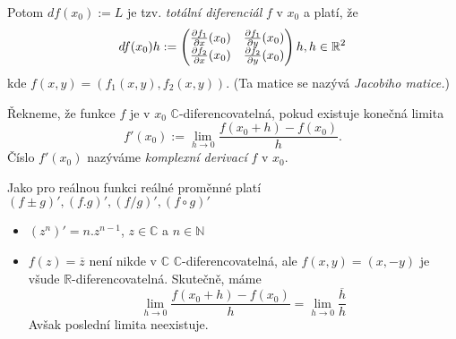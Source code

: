 \begin{note}
Potom $df(x_0):=L$ je tzv. \textit{totální diferenciál} $f$ v $x_0$ a platí, že $$df(x_0)h:=\begin{pmatrix}
\frac{\partial f_1}{\partial x}(x_0) & \frac{\partial f_1}{\partial y}(x_0)\\
\frac{\partial f_2}{\partial x}(x_0) & \frac{\partial f_2}{\partial y}(x_0)
\end{pmatrix}h,\vspace{5mm} h\in \mathbb{R}^2$$
kde $f(x,y) = (f_1(x,y),f_2(x,y)).$ (Ta matice se nazývá \textit{Jacobiho matice.})
\end{note} 


\begin{definition}
Řekneme, že funkce $f$ je v $x_0$ $\mathbb{C}$-diferencovatelná, pokud existuje konečná limita $$f'(x_0):= \lim_{h \to 0}\frac{f(x_0+h)-f(x_0)}{h}.$$ Číslo $f'(x_0)$ nazýváme \textit{komplexní derivací} $f$ v $x_0$. 
\end{definition}  

\begin{note}
Jako pro reálnou funkci reálné proměnné platí $(f\pm g)', (f.g)', (f/g)', (f\circ g)'$
\end{note} 

\begin{example}
\begin{itemize}
    \item $(z^n)' = n.z^{n-1}$, $z\in \mathbb{C}$ a $n\in \mathbb{N}$
    \item $f(z) = \overline{z}$ není nikde v $\mathbb{C}$ $\mathbb{C}$-diferencovatelná, ale $f(x,y) = (x,-y)$ je všude $\mathbb{R}$-diferencovatelná. Skutečně, máme $$\lim_{h\to 0}\frac{f(x_0+h)-f(x_0)}{h} = \lim_{h\to 0}\frac{\overline{h}}{h}$$ Avšak poslední limita neexistuje.
\end{itemize}
\end{example}




